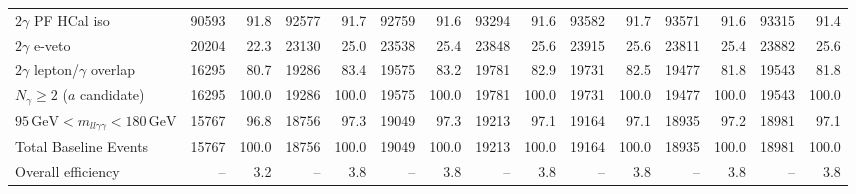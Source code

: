 \begin{table}[htbp]
{\begin{tabular}{lrrrrrrrrrrrrrr}
$2\gamma$ PF HCal iso & 90593 & 91.8 & 92577 & 91.7 & 92759 & 91.6 & 93294 & 91.6 & 93582 & 91.7 & 93571 & 91.6 & 93315 & 91.4 \\
$2\gamma$ e-veto & 20204 & 22.3 & 23130 & 25.0 & 23538 & 25.4 & 23848 & 25.6 & 23915 & 25.6 & 23811 & 25.4 & 23882 & 25.6 \\
$2\gamma$ lepton/$\gamma$ overlap & 16295 & 80.7 & 19286 & 83.4 & 19575 & 83.2 & 19781 & 82.9 & 19731 & 82.5 & 19477 & 81.8 & 19543 & 81.8 \\
$N_{\gamma}\geq 2$ ($a$ candidate) & 16295 & 100.0 & 19286 & 100.0 & 19575 & 100.0 & 19781 & 100.0 & 19731 & 100.0 & 19477 & 100.0 & 19543 & 100.0 \\
$95\,\mathrm{GeV} < m_{ll\gamma\gamma} < 180\,\mathrm{GeV}$ & 15767 & 96.8 & 18756 & 97.3 & 19049 & 97.3 & 19213 & 97.1 & 19164 & 97.1 & 18935 & 97.2 & 18981 & 97.1 \\
Total Baseline Events & 15767 & 100.0 & 18756 & 100.0 & 19049 & 100.0 & 19213 & 100.0 & 19164 & 100.0 & 18935 & 100.0 & 18981 & 100.0 \\
\hline
Overall efficiency & -- & 3.2 & -- & 3.8 & -- & 3.8 & -- & 3.8 & -- & 3.8 & -- & 3.8 & -- & 3.8 \\
\hline
\end{tabular}%
}
\end{table}

